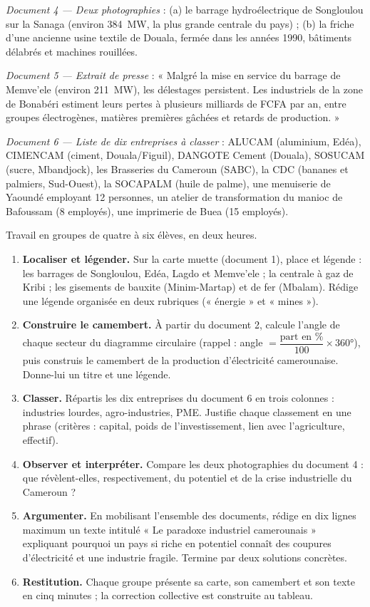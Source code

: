 \documentclass[11pt]{article}
\newcounter{popsec}
\newcounter{popsub}
\newcommand{\courssub}[1]{%
  \stepcounter{popsub}%
  \par\vspace{9pt}\noindent{\popxbold\fontsize{11.5}{13}\selectfont\color{popink}{\color{poporange}\thepopsec.\thepopsub}\hspace{6pt}#1}\par\nopagebreak\vspace{4pt}
}
\begin{document}
\emph{Document 4 — Deux photographies} : (a) le barrage hydroélectrique de Songloulou sur la Sanaga (environ \SI{384}{MW}, la plus grande centrale du pays) ; (b) la friche d'une ancienne usine textile de Douala, fermée dans les années 1990, bâtiments délabrés et machines rouillées.

\emph{Document 5 — Extrait de presse} : « Malgré la mise en service du barrage de Memve'ele (environ \SI{211}{MW}), les délestages persistent. Les industriels de la zone de Bonabéri estiment leurs pertes à plusieurs milliards de FCFA par an, entre groupes électrogènes, matières premières gâchées et retards de production. »

\emph{Document 6 — Liste de dix entreprises à classer} : ALUCAM (aluminium, Edéa), CIMENCAM (ciment, Douala/Figuil), DANGOTE Cement (Douala), SOSUCAM (sucre, Mbandjock), les Brasseries du Cameroun (SABC), la CDC (bananes et palmiers, Sud-Ouest), la SOCAPALM (huile de palme), une menuiserie de Yaoundé employant 12 personnes, un atelier de transformation du manioc de Bafoussam (8 employés), une imprimerie de Buea (15 employés).

\courssub{Consignes}

Travail en groupes de quatre à six élèves, en deux heures.

\begin{enumerate}
\item \textbf{Localiser et légender.} Sur la carte muette (document 1), place et légende : les barrages de Songloulou, Edéa, Lagdo et Memve'ele ; la centrale à gaz de Kribi ; les gisements de bauxite (Minim-Martap) et de fer (Mbalam). Rédige une légende organisée en deux rubriques (« énergie » et « mines »).
\item \textbf{Construire le camembert.} À partir du document 2, calcule l'angle de chaque secteur du diagramme circulaire (rappel : angle $= \dfrac{\text{part en \%}}{100} \times 360°$), puis construis le camembert de la production d'électricité camerounaise. Donne-lui un titre et une légende.
\item \textbf{Classer.} Répartis les dix entreprises du document 6 en trois colonnes : industries lourdes, agro-industries, PME. Justifie chaque classement en une phrase (critères : capital, poids de l'investissement, lien avec l'agriculture, effectif).
\item \textbf{Observer et interpréter.} Compare les deux photographies du document 4 : que révèlent-elles, respectivement, du potentiel et de la crise industrielle du Cameroun ?
\item \textbf{Argumenter.} En mobilisant l'ensemble des documents, rédige en dix lignes maximum un texte intitulé « Le paradoxe industriel camerounais » expliquant pourquoi un pays si riche en potentiel connaît des coupures d'électricité et une industrie fragile. Termine par deux solutions concrètes.
\item \textbf{Restitution.} Chaque groupe présente sa carte, son camembert et son texte en cinq minutes ; la correction collective est construite au tableau.
\end{enumerate}
\end{document}
